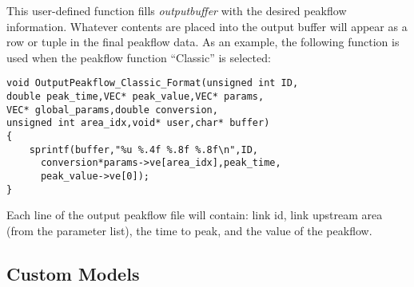 \documentclass[12pt]{article}
\begin{document}
This user-defined function fills \emph{outputbuffer} with the desired peakflow information. Whatever contents are placed into the output buffer will appear as a row or tuple in the final peakflow data. As an example, the following function is used when the peakflow function ``Classic'' is selected:
\begin{lstlisting}[style=CStyle]
void OutputPeakflow_Classic_Format(unsigned int ID,
double peak_time,VEC* peak_value,VEC* params,
VEC* global_params,double conversion,
unsigned int area_idx,void* user,char* buffer)
{
	sprintf(buffer,"%u %.4f %.8f %.8f\n",ID,
	  conversion*params->ve[area_idx],peak_time,
	  peak_value->ve[0]);
}
\end{lstlisting}
Each line of the output peakflow file will contain: link id, link upstream area (from the parameter list), the time to peak, and the value of the peakflow.


\subsection{Custom Models} \label{sec: custom models}
\end{document}

